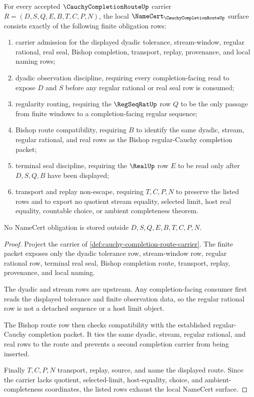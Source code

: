 \begin{theorem}
\label{thm:cauchy-completion-route-namecert-obligations}
For every accepted $\CauchyCompletionRouteUp$ carrier $R=(D,S,Q,E,B,T,C,P,N)$, the local $\NameCert_{\CauchyCompletionRouteUp}$ surface consists exactly of the following finite obligation rows:
\begin{enumerate}
\item carrier admission for the displayed dyadic tolerance, stream-window, regular rational, real seal, Bishop completion, transport, replay, provenance, and local naming rows;
\item dyadic observation discipline, requiring every completion-facing read to expose $D$ and $S$ before any regular rational or real seal row is consumed;
\item regularity routing, requiring the $\RegSeqRatUp$ row $Q$ to be the only passage from finite windows to a completion-facing regular sequence;
\item Bishop route compatibility, requiring $B$ to identify the same dyadic, stream, regular rational, and real rows as the Bishop regular-Cauchy completion packet;
\item terminal seal discipline, requiring the $\RealUp$ row $E$ to be read only after $D,S,Q,B$ have been displayed;
\item transport and replay non-escape, requiring $T,C,P,N$ to preserve the listed rows and to export no quotient stream equality, selected limit, host real equality, countable choice, or ambient completeness theorem.
\end{enumerate}
No NameCert obligation is stored outside $D,S,Q,E,B,T,C,P,N$.
\end{theorem}
\begin{proof}
Project the carrier of \autoref{def:cauchy-completion-route-carrier}. The finite packet exposes only the dyadic tolerance row, stream-window row, regular rational row, terminal real seal, Bishop completion route, transport, replay, provenance, and local naming.

The dyadic and stream rows are upstream. Any completion-facing consumer first reads the displayed tolerance and finite observation data, so the regular rational row is not a detached sequence or a host limit object.

The Bishop route row then checks compatibility with the established regular-Cauchy completion packet. It ties the same dyadic, stream, regular rational, and real rows to the route and prevents a second completion carrier from being inserted.

Finally $T,C,P,N$ transport, replay, source, and name the displayed route. Since the carrier lacks quotient, selected-limit, host-equality, choice, and ambient-completeness coordinates, the listed rows exhaust the local NameCert surface.
\end{proof}

